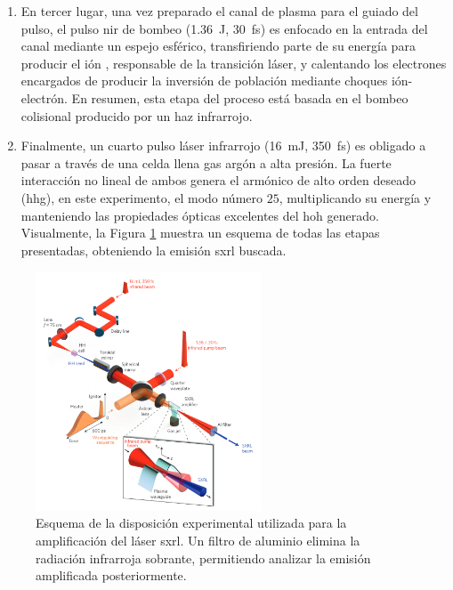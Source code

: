 \begin{enumerate}
    \item En tercer lugar, una vez preparado el canal de plasma para el guiado del pulso, el pulso \acrshort{nir} de bombeo (\qty{1.36}{J}, \qty{30}{fs}) es enfocado en la entrada del canal mediante un espejo esférico, transfiriendo parte de su energía para producir el ión , responsable de la transición láser, y calentando los electrones encargados de producir la inversión de población mediante choques ión-electrón. En resumen, esta etapa del proceso está basada en el bombeo colisional producido por un haz infrarrojo.
    \item Finalmente, un cuarto pulso láser infrarrojo (\qty{16}{mJ}, \qty{350}{fs}) es obligado a pasar a través de una celda llena gas argón a alta presión. La fuerte interacción no lineal de ambos genera el armónico de alto orden deseado (\acrshort{hhg}), en este experimento, el modo número $25$, multiplicando su energía y manteniendo las propiedades ópticas excelentes del \acrshort{hoh} generado. Visualmente, la Figura \ref{fig:3.6} muestra un esquema de todas las etapas presentadas, obteniendo la emisión \acrshort{sxrl} buscada.

\end{enumerate}

\begin{figure}[htbp]
  \centering
  \includegraphics[width=0.6\textwidth]{Figuras/ch3_exper1.png}
  \caption{Esquema de la disposición experimental\autocite{Depresseux2015} utilizada para la amplificación del láser \acrshort{sxrl}. Un filtro de aluminio elimina la radiación infrarroja sobrante, permitiendo analizar la emisión amplificada posteriormente.}
  \label{fig:3.6}
\end{figure}

